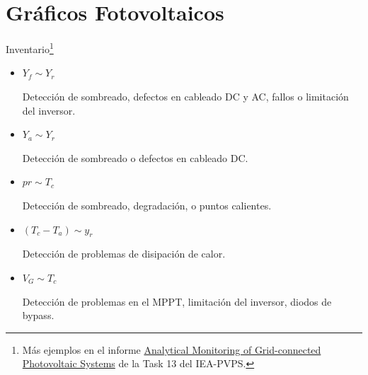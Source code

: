 \documentclass[aspectratio=169, usenames,svgnames,dvipsnames]{beamer}
\begin{document}
\section{Gráficos Fotovoltaicos}
\label{sec:orge00dd86}

\begin{frame}[label={sec:orga8c00e3}]{Inventario\footnote{Más ejemplos en el informe \guillemotleft{}\href{https://iea-pvps.org/key-topics/analytical-monitoring-of-pv-systems-final/}{Analytical Monitoring of Grid-connected Photovoltaic Systems}\guillemotright{} de la Task 13 del IEA-PVPS.}}
\begin{itemize}
\item \(Y_f \sim Y_r\) 

Detección de sombreado, defectos en cableado DC y AC, fallos o limitación del inversor.

\item \(Y_a \sim Y_r\)

Detección de sombreado o defectos en cableado DC.

\item \(pr \sim T_c\) 

Detección de sombreado, degradación, o puntos calientes.

\item \((T_c - T_a) \sim y_r\)

Detección de problemas de disipación de calor.

\item \(V_G \sim T_c\)

Detección de problemas en el MPPT, limitación del inversor, diodos de bypass.
\end{itemize}
\end{frame}
\end{document}
